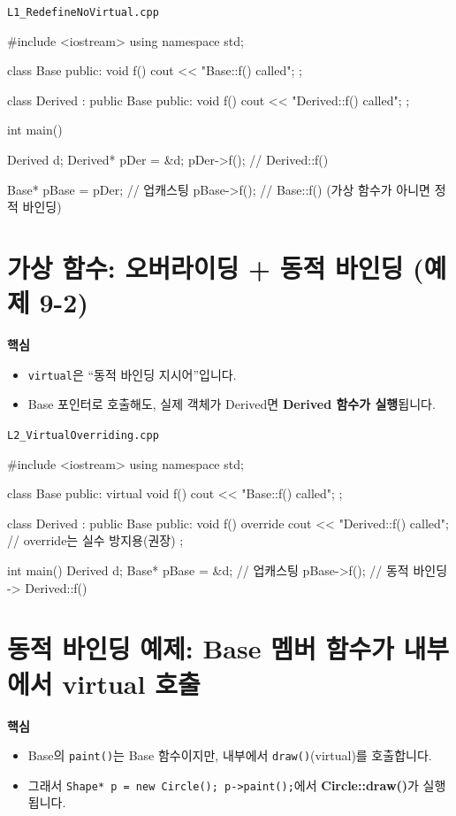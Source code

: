 \documentclass[11pt,a4paper]{article}
\newcommand{\filetag}[1]{\texttt{\color{Accent}#1}}
\begin{document}
\noindent\filetag{L1\_RedefineNoVirtual.cpp}
\begin{cppcode}
#include <iostream>
using namespace std;

class Base {
public:
    void f() { cout << "Base::f() called\n"; }
};

class Derived : public Base {
public:
    void f() { cout << "Derived::f() called\n"; }
};

int main() {
    Derived d;
    Derived* pDer = &d;
    pDer->f();             // Derived::f()

    Base* pBase = pDer;    // 업캐스팅
    pBase->f();            // Base::f() (가상 함수가 아니면 정적 바인딩)
}
\end{cppcode}

\section{가상 함수: 오버라이딩 + 동적 바인딩 (예제 9-2)}
\begin{GoalBox}
\textbf{핵심}
\begin{itemize}[leftmargin=18pt]
  \item \texttt{virtual}은 ``동적 바인딩 지시어''입니다.
  \item Base 포인터로 호출해도, 실제 객체가 Derived면 \textbf{Derived 함수가 실행}됩니다.
\end{itemize}
\end{GoalBox}

\noindent\filetag{L2\_VirtualOverriding.cpp}
\begin{cppcode}
#include <iostream>
using namespace std;

class Base {
public:
    virtual void f() { cout << "Base::f() called\n"; }
};

class Derived : public Base {
public:
    void f() override { cout << "Derived::f() called\n"; } // override는 실수 방지용(권장)
};

int main() {
    Derived d;
    Base* pBase = &d;  // 업캐스팅
    pBase->f();        // 동적 바인딩 -> Derived::f()
}
\end{cppcode}

\section{동적 바인딩 예제: Base 멤버 함수가 내부에서 virtual 호출}
\begin{GoalBox}
\textbf{핵심}
\begin{itemize}[leftmargin=18pt]
  \item Base의 \texttt{paint()}는 Base 함수이지만, 내부에서 \texttt{draw()}(virtual)를 호출합니다.
  \item 그래서 \texttt{Shape* p = new Circle(); p->paint();}에서 \textbf{Circle::draw()}가 실행됩니다.
\end{itemize}
\end{GoalBox}
\end{document}
